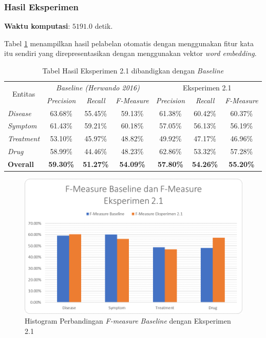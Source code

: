 	\subsubsection{Hasil Eksperimen}
	\textbf{Waktu komputasi}: $ 5191.0 $ detik.
	
	Tabel \ref{table:ekskata} menampilkan hasil pelabelan otomatis dengan menggunakan fitur kata itu sendiri yang direpresentasikan dengan menggunakan vektor \textit{word embedding}.
	
	\begin{table}
		\centering
		\caption{Tabel Hasil Eksperimen 2.1 dibandigkan dengan \textit{Baseline}}
		\begin{tabular}{|l|c|c|c|c|c|c|}
			\hline
			\multicolumn{1}{|c|}{\multirow{2}{*}{Entitas}} & \multicolumn{3}{c|}{\textit{Baseline (Herwando 2016)}} & \multicolumn{3}{c|}{Eksperimen 2.1} \\ \cline{2-7} 
			\multicolumn{1}{|c|}{} & \textit{Precision} & \textit{Recall} & \textit{F-Measure} & \textit{Precision} & \textit{Recall} & \textit{F-Measure} \\ \hline
			\textit{Disease} & 63.68\% & 55.45\% & 59.13\% & 61.38\% & 60.42\% & 60.37\% \\ \hline
			\textit{Symptom} & 61.43\% & 59.21\% & 60.18\% & 57.05\% & 56.13\% & 56.19\% \\ \hline
			\textit{Treatment} & 53.10\% & 45.97\% & 48.82\% & 49.92\% & 47.17\% & 46.96\% \\ \hline
			\textit{Drug} & 58.99\% & 44.46\% & 48.23\% & 62.86\% & 53.32\% & 57.28\% \\ \hline
			\textbf{Overall} & \textbf{59.30\%} & \textbf{51.27\%} & \textbf{54.09\%} & \textbf{57.80\%} & \textbf{54.26\%} & \textbf{55.20\%} \\ \hline
		\end{tabular}
	\label{table:ekskata}
	\end{table}

	\begin{figure}
	  \centering
	  \includegraphics[width=0.85\linewidth]{images/histogram00}
	  \caption{Histogram Perbandingan \textit{F-measure} \textit{Baseline} dengan Eksperimen 2.1}
	  \label{fig:ekskata}
	\end{figure}
		
